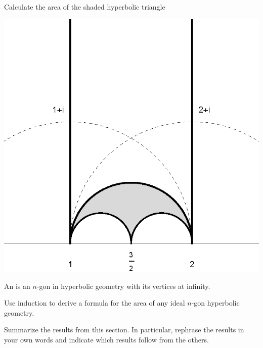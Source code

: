 \documentclass[newpage,hints,handout]{ximera}
\begin{document}
\begin{problem}
  Calculate the area of the shaded hyperbolic triangle
  
\begin{image}
 \includegraphics{fareycell}
 
\end{image}
  \end{problem}


\begin{definition}
  An  is an $n$-gon in hyperbolic
  geometry with its vertices at infinity.
\end{definition}

\begin{problem}
Use induction to derive a formula for the area of any ideal $n$-gon 
hyperbolic geometry.
\end{problem}



\begin{problem}
Summarize the results from this section. In particular, rephrase the results in your own words and indicate which
results follow from the others.
\begin{freeResponse}
\end{freeResponse}
\end{problem}
\end{document}
